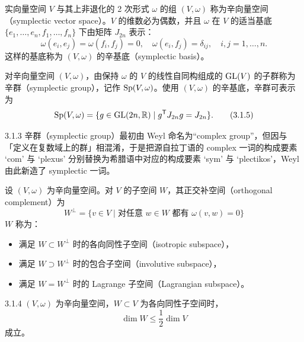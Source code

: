 实向量空间 $V$ 与其上非退化的 2 次形式 $\omega$ 的组 $(V,\omega)$ 称为辛向量空间（symplectic vector space）。$V$ 的维数必为偶数，并且 $\omega$ 在 $V$ 的适当基底 $\{e_1,\dots,e_n,f_1,\dots,f_n\}$ 下由矩阵 $J_{2n}$ 表示：
\begin{equation}
  \omega(e_i,e_j)=\omega(f_i,f_j)=0,\quad \omega(e_i,f_j)=\delta_{ij},\quad i,j=1,\dots,n.
  \tag{3.1.4}
\end{equation}
这样的基底称为 $(V,\omega)$ 的辛基底（symplectic basis）。

对辛向量空间 $(V,\omega)$，由保持 $\omega$ 的 $V$ 的线性自同构组成的 $\operatorname{GL}(V)$ 的子群称为辛群（symplectic group），记作 $\operatorname{Sp}(V,\omega)$。使用 $(V,\omega)$ 的辛基底，辛群可表示为
\begin{equation}
  \operatorname{Sp}(V,\omega)=\{g\in\operatorname{GL}(2n,\mathbb{R})\mid g^{\mathsf T}J_{2n}g=J_{2n}\}.
  \tag{3.1.5}
\end{equation}

\begin{remark}{3.1.3}
  辛群（symplectic group）最初由 Weyl 命名为“complex group”，但因与「定义在复数域上的群」相混淆，于是把源自拉丁语的 complex 一词的构成要素 ‘com’ 与 ‘plexus’ 分别替换为希腊语中对应的构成要素 ‘sym’ 与 ‘plectikos’，Weyl 由此新造了 symplectic 一词。
\end{remark}


设 $(V,\omega)$ 为辛向量空间。对 $V$ 的子空间 $W$，其正交补空间（orthogonal complement）为
\begin{equation}
  W^\perp=\{v\in V\mid \text{对任意 } w\in W \text{ 都有 } \omega(v,w)=0\}
  \tag{3.1.6}
\end{equation}
$W$ 称为：
\begin{itemize}[leftmargin=2.5em,itemsep=2pt,topsep=3pt]
  \item 满足 $W\subset W^\perp$ 时的各向同性子空间（isotropic subspace），
  \item 满足 $W\supset W^\perp$ 时的包合子空间（involutive subspace），
  \item 满足 $W=W^\perp$ 时的 Lagrange 子空间（Lagrangian subspace）。
\end{itemize}

\begin{proposition*}{3.1.4}
  $(V,\omega)$ 为辛向量空间，$W\subset V$ 为各向同性子空间时，
  \begin{equation}
    \dim W\le \frac{1}{2}\dim V
    \tag{3.1.7}
  \end{equation}
  成立。
\end{proposition*}


